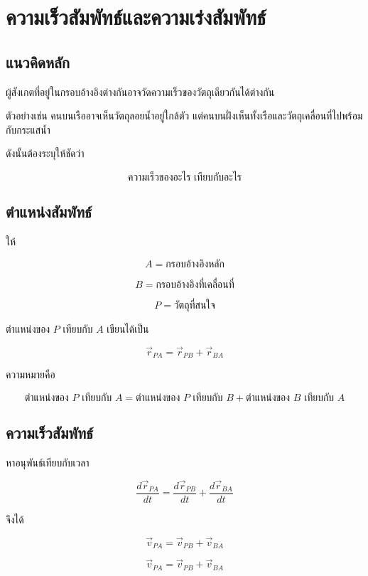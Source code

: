 \section{ความเร็วสัมพัทธ์และความเร่งสัมพัทธ์}

\subsection{แนวคิดหลัก}

ผู้สังเกตที่อยู่ในกรอบอ้างอิงต่างกันอาจวัดความเร็วของวัตถุเดียวกันได้ต่างกัน

ตัวอย่างเช่น คนบนเรืออาจเห็นวัตถุลอยน้ำอยู่ใกล้ตัว แต่คนบนฝั่งเห็นทั้งเรือและวัตถุเคลื่อนที่ไปพร้อมกับกระแสน้ำ

ดังนั้นต้องระบุให้ชัดว่า

\[
\text{ความเร็วของอะไร เทียบกับอะไร}
\]

\subsection{ตำแหน่งสัมพัทธ์}

ให้

\[
A=\text{กรอบอ้างอิงหลัก}
\]

\[
B=\text{กรอบอ้างอิงที่เคลื่อนที่}
\]

\[
P=\text{วัตถุที่สนใจ}
\]

ตำแหน่งของ $P$ เทียบกับ $A$ เขียนได้เป็น

\[
\vec{r}_{PA}=\vec{r}_{PB}+\vec{r}_{BA}
\]

ความหมายคือ

\[
\text{ตำแหน่งของ }P\text{ เทียบกับ }A
=
\text{ตำแหน่งของ }P\text{ เทียบกับ }B
+
\text{ตำแหน่งของ }B\text{ เทียบกับ }A
\]

\subsection{ความเร็วสัมพัทธ์}

หาอนุพันธ์เทียบกับเวลา

\[
\frac{d\vec{r}_{PA}}{dt}
=
\frac{d\vec{r}_{PB}}{dt}
+
\frac{d\vec{r}_{BA}}{dt}
\]

จึงได้

\[
\vec{v}_{PA}=\vec{v}_{PB}+\vec{v}_{BA}
\]

\begin{tcolorbox}[title=สมการความเร็วสัมพัทธ์]
\[
\vec{v}_{PA}=\vec{v}_{PB}+\vec{v}_{BA}
\]
\end{tcolorbox}

